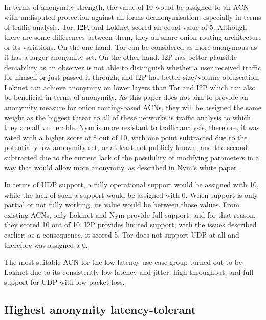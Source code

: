 In terms of anonymity strength, the value of 10 would be assigned to an ACN with undisputed protection against all forms deanonymisation, especially in terms of traffic analysis. Tor, I2P, and Lokinet scored an equal value of 5. Although there are some differences between them, they all share onion routing architecture or its variations. On the one hand, Tor can be considered as more anonymous as it has a larger anonymity set. On the other hand, I2P has better plausible deniability as an observer is not able to distinguish whether a user received traffic for himself or just passed it through, and I2P has better size/volume obfuscation. Lokinet can achieve anonymity on lower layers than Tor and I2P which can also be beneficial in terms of anonymity. As this paper does not aim to provide an anonymity measure for onion routing-based ACNs, they will be assigned the same weight as the biggest threat to all of these networks is traffic analysis to which they are all vulnerable. Nym is more resistant to traffic analysis, therefore, it was rated with a higher score of 8 out of 10, with one point subtracted due to the potentially low anonymity set, or at least not publicly known, and the second subtracted due to the current lack of the possibility of modifying parameters in a way that would allow more anonymity, as described in Nym's white paper \cite{nym}.

In terms of UDP support, a fully operational support would be assigned with 10, while the lack of such a support would be assigned with 0. When support is only partial or not fully working, its value would be between those values. From existing ACNs, only Lokinet and Nym provide full support, and for that reason, they scored 10 out of 10. I2P provides limited support, with the issues described earlier; as a consequence, it scored 5. Tor does not support UDP at all and therefore was assigned a 0.

The most suitable ACN for the low-latency use case group turned out to be Lokinet due to its consistently low latency and jitter, high throughput, and full support for UDP with low packet loss.

\subsection{Highest anonymity latency-tolerant}

